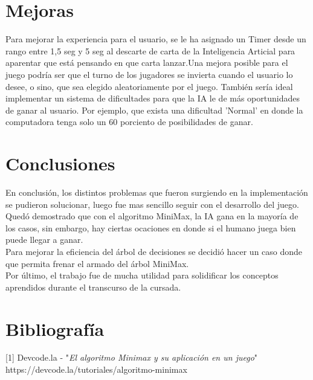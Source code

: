 \documentclass[12pt,a4paper]{article}
\begin{document}
\section{Mejoras}
Para mejorar la experiencia para el usuario, se le ha asignado un Timer desde un rango entre 1,5 seg y 5 seg al descarte de carta de la Inteligencia Articial para aparentar que está pensando en que carta lanzar.Una mejora posible para el juego podría ser que el turno de los jugadores se invierta cuando el usuario lo desee, o sino, que sea elegido aleatoriamente por el juego. También sería ideal implementar un sistema de dificultades para que la IA le de más oportunidades de ganar al usuario. Por ejemplo, que exista una dificultad 'Normal' en donde la computadora tenga solo un 60 porciento de posibilidades de ganar.

\section{Conclusiones}
En conclusión, los distintos problemas que fueron surgiendo en la implementación se pudieron solucionar, luego fue mas sencillo seguir con el desarrollo del juego.\\

Quedó demostrado que con el algoritmo MiniMax, la IA gana en la mayoría de los casos, sin embargo, hay ciertas ocaciones en donde si el humano juega bien puede llegar a ganar.\\

Para mejorar la eficiencia del árbol de decisiones se decidió hacer un caso donde que permita frenar el armado del árbol MiniMax.\\

Por último, el trabajo fue de mucha utilidad para solidificar los conceptos aprendidos durante el transcurso de la cursada.
\newpage
\section{Bibliografía}
[1] Devcode.la - "\emph{El algoritmo Minimax y su aplicación en un juego}"\\
https://devcode.la/tutoriales/algoritmo-minimax
\end{document}

